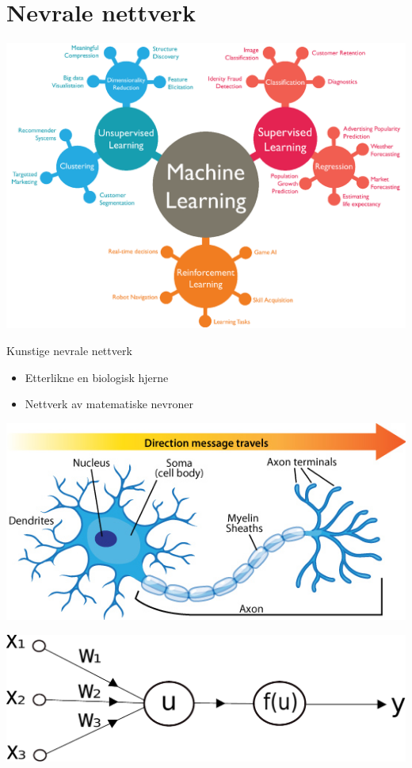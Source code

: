 \documentclass{beamer}
\begin{document}
\section{Nevrale nettverk}

\begin{frame}
 
\includegraphics[width=0.9\linewidth]{../Figures/Theory/MachineLearningDiagram.png}

\end{frame}


\begin{frame}

\begin{block}{Kunstige nevrale nettverk}
 \begin{itemize}
  \item Etterlikne en biologisk hjerne
  \item Nettverk av matematiske nevroner
 \end{itemize}
\end{block}


\end{frame}


\begin{frame}
 
\centering
\includegraphics[width=0.8\linewidth]{../Figures/Theory/neuron_anatomy.jpg} 

\includegraphics[width=0.8\linewidth]{../Figures/Theory/neuron.pdf} 

\end{frame}
\end{document}
